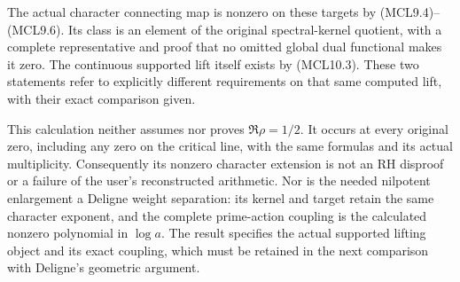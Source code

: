 The actual character connecting map is nonzero on these targets by
(MCL9.4)--(MCL9.6). Its class is an element of the original
spectral-kernel quotient, with a complete representative and proof that
no omitted global dual functional makes it zero. The continuous
supported lift itself exists by (MCL10.3). These two statements refer to
explicitly different requirements on that same computed lift, with their
exact comparison given.

This calculation neither assumes nor proves \(\Re\rho=1/2\). It occurs
at every original zero, including any zero on the critical line, with
the same formulas and its actual multiplicity. Consequently its nonzero
character extension is not an RH disproof or a failure of the user's
reconstructed arithmetic. Nor is the needed nilpotent enlargement a
Deligne weight separation: its kernel and target retain the same
character exponent, and the complete prime-action coupling is the
calculated nonzero polynomial in \(\log a\). The result specifies the
actual supported lifting object and its exact coupling, which must be
retained in the next comparison with Deligne's geometric argument.
